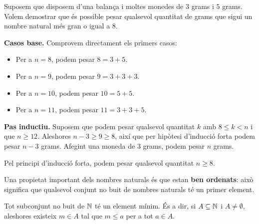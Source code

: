 \begin{exemple}
Suposem que disposem d'una balança i moltes monedes de $3$ grams i $5$ grams. Volem demostrar que és possible pesar qualsevol quantitat de grams que sigui un nombre natural més gran o igual a $8$.
\end{exemple}

\begin{solucio}
\textbf{Casos base.} Comprovem directament els primers casos:
\begin{itemize}
\item Per a $n=8$, podem pesar $8=3+5$.
\item Per a $n=9$, podem pesar $9=3+3+3$.
\item Per a $n=10$, podem pesar $10=5+5$.
\item Per a $n=11$, podem pesar $11=3+3+5$.
\end{itemize}

\textbf{Pas inductiu.} Suposem que podem pesar qualsevol quantitat $k$ amb $8\leq k<n$ i que $n\geq 12$. Aleshores $n-3\geq 9\geq 8$, així que per hipòtesi d'inducció forta podem pesar $n-3$ grams. Afegint una moneda de $3$ grams, podem pesar $n$ grams.

Pel principi d'inducció forta, podem pesar qualsevol quantitat $n\geq 8$.
\end{solucio}

Una propietat important dels nombres naturals és que estan \textbf{ben ordenats}: això significa que qualsevol conjunt no buit de nombres naturals té un primer element.

\begin{teorema}\label{teo:bon-ordre-naturals}
Tot subconjunt no buit de $\mathbb{N}$ té un element mínim. És a dir, si $A\subseteq \mathbb{N}$ i $A\neq\emptyset$, aleshores existeix $m\in A$ tal que $m\leq a$ per a tot $a\in A$.
\end{teorema}


